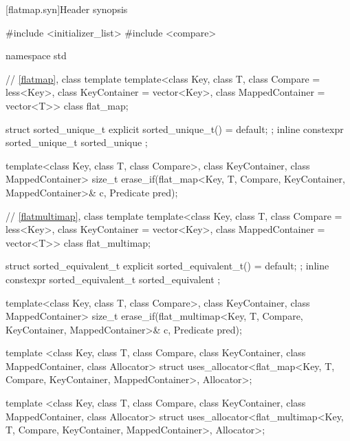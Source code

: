 \noindent\makebox[\linewidth]{\rule{\textwidth}{0.4pt}}

\setcounter{subsection}{3}
\begin{addedblock}
[flatmap.syn]{Header  synopsis}%
%

\begin{codeblock}
#include <initializer_list>
#include <compare>

namespace std {
  // \ref{flatmap}, class template 
  template<class Key, class T, class Compare = less<Key>,
           class KeyContainer = vector<Key>, class MappedContainer = vector<T>>
    class flat_map;

  struct sorted_unique_t { explicit sorted_unique_t() = default; };
  inline constexpr sorted_unique_t sorted_unique {};

  template<class Key, class T, class Compare>,
           class KeyContainer, class MappedContainer>
    size_t erase_if(flat_map<Key, T, Compare, KeyContainer, MappedContainer>& c,
                    Predicate pred);

  // \ref{flatmultimap}, class template 
  template<class Key, class T, class Compare = less<Key>,
           class KeyContainer = vector<Key>, class MappedContainer = vector<T>>
    class flat_multimap;

  struct sorted_equivalent_t { explicit sorted_equivalent_t() = default; };
  inline constexpr sorted_equivalent_t sorted_equivalent {};

  template<class Key, class T, class Compare>,
           class KeyContainer, class MappedContainer>
    size_t erase_if(flat_multimap<Key, T, Compare, KeyContainer, MappedContainer>& c,
                    Predicate pred);

  template <class Key, class T, class Compare,
            class KeyContainer,
            class MappedContainer, class Allocator>
    struct uses_allocator<flat_map<Key, T, Compare, KeyContainer, MappedContainer>,
                          Allocator>;

  template <class Key, class T, class Compare,
            class KeyContainer,
            class MappedContainer, class Allocator>
    struct uses_allocator<flat_multimap<Key, T, Compare, KeyContainer, MappedContainer>,
                          Allocator>;

}
\end{codeblock}
\end{addedblock}

\noindent\makebox[\linewidth]{\rule{\textwidth}{0.4pt}}

